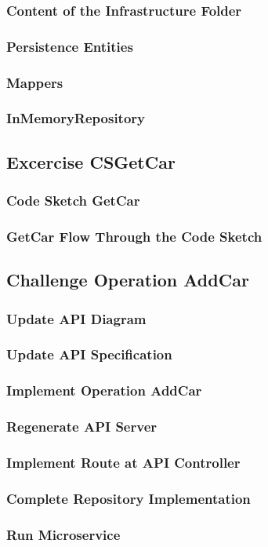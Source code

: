 \subsubsection*{Content of the Infrastructure Folder}
\subsubsection*{Persistence Entities}
\subsubsection*{Mappers}
\subsubsection*{InMemoryRepository}

\subsection{Excercise CSGetCar}
\subsubsection*{Code Sketch GetCar}
\subsubsection*{GetCar Flow Through the Code Sketch}

\subsection{Challenge Operation AddCar}
\subsubsection*{Update API Diagram}
\subsubsection*{Update API Specification}
\subsubsection*{Implement Operation AddCar}
\subsubsection*{Regenerate API Server}
\subsubsection*{Implement Route at API Controller}
\subsubsection*{Complete Repository Implementation}
\subsubsection*{Run Microservice}